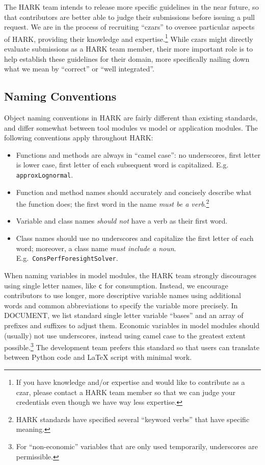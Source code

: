 \documentclass[12pt,titlepage,letterpaper]{econtex}
\begin{document}
The HARK team intends to release more specific guidelines in the near future, so that contributors are better able to judge their submissions before issuing a pull request.  We are in the process of recruiting ``czars'' to oversee particular aspects of HARK, providing their knowledge and expertise.\footnote{If you have knowledge and/or expertise and would like to contribute as a czar, please contact a HARK team member so that we can judge your credentials even though we have way less expertise.}  While czars might directly evaluate submissions as a HARK team member, their more important role is to help establish these guidelines for their domain, more specifically nailing down what we mean by ``correct'' or ``well integrated''.

\subsection{Naming Conventions}\label{sec:NamingConventions}

Object naming conventions in HARK are fairly different than existing standards, and differ somewhat between tool modules vs model or application modules.  The following conventions apply throughout HARK:
\begin{itemize}
\item Functions and methods are always in ``camel case'': no underscores, first letter is lower case, first letter of each subsequent word is capitalized.  E.g. \texttt{approxLognormal}.

\item Function and method names should accurately and concisely describe what the function does; the first word in the name \textit{must be a verb}.\footnote{HARK standards have specified several ``keyword verbs'' that have specific meaning.}

\item Variable and class names \textit{should not} have a verb as their first word.

\item Class names should use no underscores and capitalize the first letter of each word; moreover, a class name \textit{must include a noun}.  E.g.\ \texttt{ConsPerfForesightSolver}.
\end{itemize}

When naming variables in model modules, the HARK team strongly discourages using single letter names, like \texttt{c} for consumption.  Instead, we encourage contributors to use longer, more descriptive variable names using additional words and common abbreviations to specify the variable more precisely.  In DOCUMENT, we list standard single letter variable ``bases'' and an array of prefixes and suffixes to adjust them.  Economic variables in model modules should (usually) not use underscores, instead using camel case to the greatest extent possible.\footnote{For ``non-economic'' variables that are only used temporarily, underscores are permissible.}  The development team prefers this standard so that users can translate between Python code and LaTeX script with minimal work.
\end{document}
